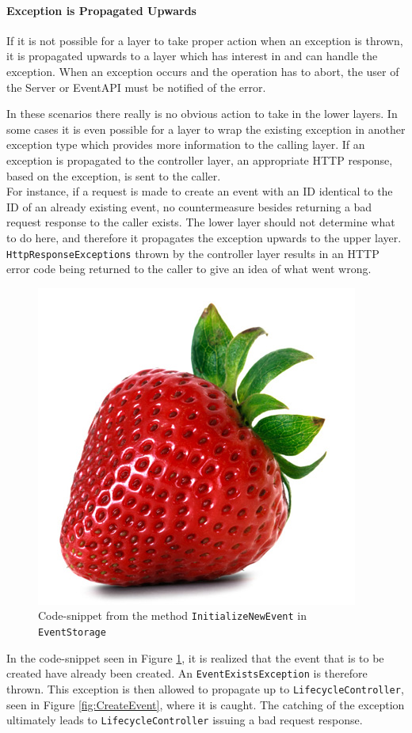 \paragraph{Exception is Propagated Upwards}
If it is not possible for a layer to take proper action when an exception is thrown, it is propagated upwards to a layer which has interest in and can handle the exception.
When an exception occurs and the operation has to abort, the user of the Server or EventAPI must be notified of the error. 

In these scenarios there really is no obvious action to take in the lower layers. In some cases it is even possible for a layer to wrap the existing exception in another exception type which provides more information to the calling layer. If an exception is propagated to the controller layer, an appropriate HTTP response, based on the exception, is sent to the caller.\\

For instance, if a request is made to create an event with an ID identical to the ID of an already existing event, no countermeasure besides returning a bad request response to the caller exists. The lower layer should not determine what to do here, and therefore it propagates the exception upwards to the upper layer. \texttt{HttpResponseExceptions} thrown by the controller layer results in an HTTP error code being returned to the caller to give an idea of what went wrong.

\begin{figure}[h!]
\centering
\includegraphics[width=0.3\linewidth]{figures/strawberry}
\caption{\label{fig:InitializeNewEvent}Code-snippet from the method \texttt{InitializeNewEvent} in \texttt{EventStorage}}
\end{figure}

In the code-snippet seen in Figure \ref{fig:InitializeNewEvent}, it is realized that the event that is to be created have already been created. An \texttt{EventExistsException} is therefore thrown. This exception is then allowed to propagate up to \texttt{LifecycleController}, seen in Figure \ref{fig:CreateEvent}, where it is caught. The catching of the exception ultimately leads to \texttt{LifecycleController} issuing a bad request response. 

